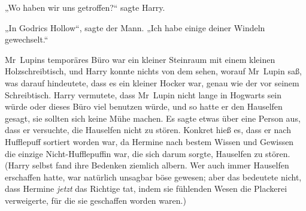 „Wo haben wir uns getroffen?“ sagte Harry.

„In Godrics Hollow“, sagte der Mann.
„Ich habe einige deiner Windeln gewechselt.“

\later

Mr~Lupins temporäres Büro war ein kleiner Steinraum mit einem kleinen Holzschreibtisch, und Harry konnte nichts von dem sehen, worauf Mr~Lupin saß, was darauf hindeutete, dass es ein kleiner Hocker war, genau wie der vor seinem Schreibtisch. Harry vermutete, dass Mr~Lupin nicht lange in Hogwarts sein würde oder dieses Büro viel benutzen würde, und so hatte er den Hauselfen gesagt, sie sollten sich keine Mühe machen. Es sagte etwas über eine Person aus, dass er versuchte, die Hauselfen nicht zu stören. Konkret hieß es, dass er nach Hufflepuff sortiert worden war, da Hermine nach bestem Wissen und Gewissen die einzige Nicht-Hufflepuffin war, die sich darum sorgte, Hauselfen zu stören. (Harry selbst fand ihre Bedenken ziemlich albern. Wer auch immer Hauselfen erschaffen hatte, war natürlich unsagbar böse gewesen; aber das bedeutete nicht, dass Hermine \emph{jetzt} das Richtige tat, indem sie fühlenden Wesen die Plackerei verweigerte, für die sie geschaffen worden waren.)

